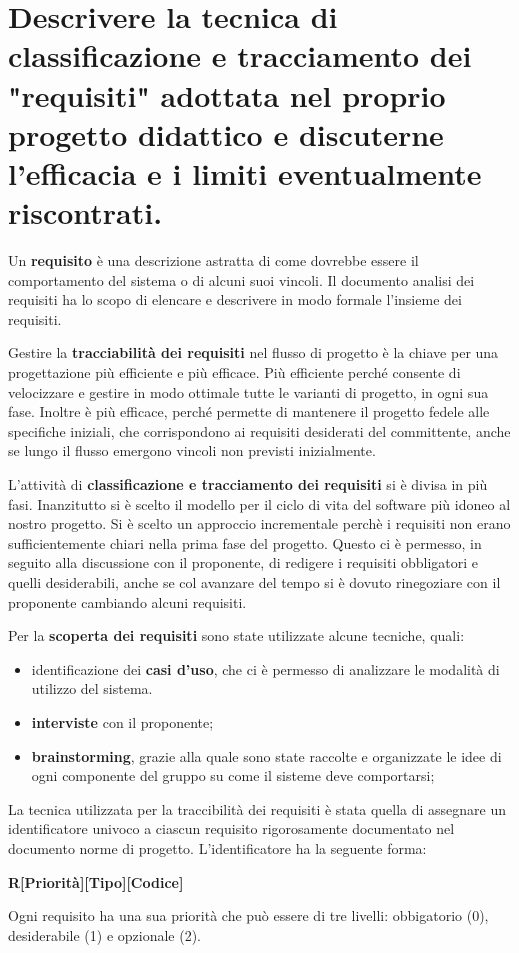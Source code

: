 \section{Descrivere la tecnica di classificazione e tracciamento dei "requisiti" adottata nel proprio progetto didattico e discuterne l'efficacia e i limiti eventualmente riscontrati.}

Un \textbf{requisito} è una descrizione astratta di come dovrebbe essere il comportamento del sistema o di alcuni suoi vincoli. Il documento analisi dei requisiti ha lo scopo di elencare e descrivere in modo formale l'insieme dei requisiti.

Gestire la \textbf{tracciabilità dei requisiti} nel flusso di progetto è la chiave per una progettazione più efficiente e più efficace.  Più efficiente perché consente di velocizzare e gestire in modo ottimale tutte le varianti di progetto, in ogni sua fase. Inoltre è più efficace, perché permette di mantenere il progetto fedele alle specifiche iniziali, che corrispondono ai requisiti desiderati del committente, anche se lungo il flusso emergono vincoli non previsti inizialmente.

L'attività di \textbf{classificazione e tracciamento dei requisiti} si è divisa in più fasi. Inanzitutto si è scelto il modello per il ciclo di vita del software più idoneo al nostro progetto. Si è scelto un approccio incrementale perchè i requisiti non erano sufficientemente chiari nella prima fase del progetto. Questo ci è permesso, in seguito alla discussione con il proponente, di redigere i requisiti obbligatori e quelli desiderabili, anche se col avanzare del tempo si è dovuto rinegoziare con il proponente cambiando alcuni requisiti.

Per la \textbf{scoperta dei requisiti} sono state utilizzate alcune tecniche, quali:
\begin{itemize}
\item identificazione dei \textbf{casi d'uso}, che ci è permesso di analizzare le modalità di utilizzo del sistema.
\item \textbf{interviste} con il proponente;
\item \textbf{brainstorming}, grazie alla quale sono state raccolte e organizzate le idee di ogni componente del gruppo su come il sisteme deve comportarsi;
\end{itemize}

La tecnica utilizzata per la traccibilità dei requisiti è stata quella di assegnare un identificatore univoco a ciascun requisito rigorosamente documentato nel documento norme di progetto. L'identificatore ha la seguente forma:
\begin{center}
\textbf{R[Priorità][Tipo][Codice]}
\end{center}
Ogni requisito ha una sua priorità che può essere di tre livelli: obbigatorio (0), desiderabile (1) e opzionale (2).

